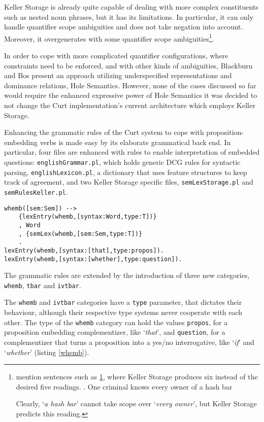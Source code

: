 \documentclass[notitlepage,twoside,a4paper]{scrreprt}
\newcommand{\abbr}{\textsf} %
\newcommand{\code}[1]{\texttt{#1}} %
\newcommand{\pn}{\textsf} %
\newcommand{\example}[1]{`\textit{#1}'} %
\newcommand{\curt}{\pn{Curt}}
\theoremstyle{remark}
\theoremstyle{remark}
\theoremstyle{definition}
\theoremstyle{definition}
\begin{document}
\pn{Keller Storage} is already quite capable
of dealing with more complex constituents such as nested noun phrases, but it
has its limitations. In particular, it can only handle quantifier scope
ambiguities and does not take negation into account. Moreover, it overgenerates
with some quantifier scope ambiguities\footnote{\cite{blackburnbos:cl1} mention
sentences such as \ref{ex:kellersucks}, where Keller Storage produces six
instead of the desired five readings.
\ex. One criminal knows every owner of a hash bar\label{ex:kellersucks}

Clearly, \example{a hash bar} cannot take scope over \example{every owner}, but
Keller Storage predicts this reading.}.

In order to cope with more complicated quantifier configurations, where
constraints need to be enforced, and with other kinds of ambiguities,
Blackburn and Bos present an approach utilizing underspecified representations and
dominance relations, \pn{Hole Semantics}.
However, none of the cases discussed so far would require the enhanced
expressive power of \pn{Hole Semantics} it was decided to not change the \curt{}
implementation's current architecture which employs \pn{Keller Storage}.

Enhancing the grammatic rules of the \curt{} system to cope with
proposition-embedding verbs is made easy by its elaborate grammatical back
end. In particular, four files are enhanced with rules to enable interpretation
of embedded questions: \code{englishGrammar.pl}, which holds generic \abbr{DCG}
rules for syntactic parsing, \code{englishLexicon.pl}, a dictionary that uses
feature structures to keep track of agreement, and two \pn{Keller Storage}
specific files, \code{semLexStorage.pl} and \code{semRulesKeller.pl}.

\begin{lstlisting}[label=whemb,caption={Syntactic and Lexical Rules for Complementizers},float]
whemb([sem:Sem]) -->
    {lexEntry(whemb,[syntax:Word,type:T])}
    , Word
    , {semLex(whemb,[sem:Sem,type:T])}
    .
lexEntry(whemb,[syntax:[that],type:propos]).
lexEntry(whemb,[syntax:[whether],type:question]).
\end{lstlisting}

The grammatic rules are extended by the introduction of three new categories,
\code{whemb}, \code{tbar} and \code{ivtbar}.

The \code{whemb} and \code{ivtbar} categories have a \code{type} parameter, that dictates
their behaviour, although their respective type systems never cooperate with
each other. The type of the \code{whemb} category can hold the values
\code{propos}, for a proposition embedding complementizer, like \example{that},
and \code{question}, for a complementizer that turns a proposition into a yes/no
interrogative, like \example{if} and \example{whether} (listing \ref{whemb}).
\end{document}
